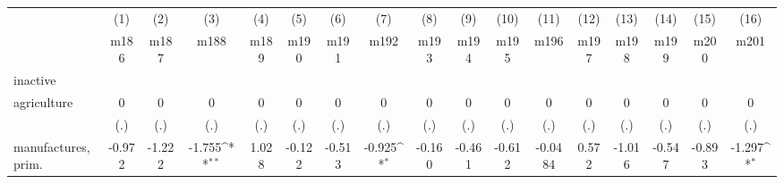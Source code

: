 {
\def\sym#1{\ifmmode^{#1}\else\(^{#1}\)\fi}
\begin{tabular}{l*{16}{c}}
\hline\hline
                    &\multicolumn{1}{c}{(1)}&\multicolumn{1}{c}{(2)}&\multicolumn{1}{c}{(3)}&\multicolumn{1}{c}{(4)}&\multicolumn{1}{c}{(5)}&\multicolumn{1}{c}{(6)}&\multicolumn{1}{c}{(7)}&\multicolumn{1}{c}{(8)}&\multicolumn{1}{c}{(9)}&\multicolumn{1}{c}{(10)}&\multicolumn{1}{c}{(11)}&\multicolumn{1}{c}{(12)}&\multicolumn{1}{c}{(13)}&\multicolumn{1}{c}{(14)}&\multicolumn{1}{c}{(15)}&\multicolumn{1}{c}{(16)}\\
                    &\multicolumn{1}{c}{m186}&\multicolumn{1}{c}{m187}&\multicolumn{1}{c}{m188}&\multicolumn{1}{c}{m189}&\multicolumn{1}{c}{m190}&\multicolumn{1}{c}{m191}&\multicolumn{1}{c}{m192}&\multicolumn{1}{c}{m193}&\multicolumn{1}{c}{m194}&\multicolumn{1}{c}{m195}&\multicolumn{1}{c}{m196}&\multicolumn{1}{c}{m197}&\multicolumn{1}{c}{m198}&\multicolumn{1}{c}{m199}&\multicolumn{1}{c}{m200}&\multicolumn{1}{c}{m201}\\
\hline
inactive            &                     &                     &                     &                     &                     &                     &                     &                     &                     &                     &                     &                     &                     &                     &                     &                     \\
agriculture         &           0         &           0         &           0         &           0         &           0         &           0         &           0         &           0         &           0         &           0         &           0         &           0         &           0         &           0         &           0         &           0         \\
                    &         (.)         &         (.)         &         (.)         &         (.)         &         (.)         &         (.)         &         (.)         &         (.)         &         (.)         &         (.)         &         (.)         &         (.)         &         (.)         &         (.)         &         (.)         &         (.)         \\
[1em]
manufactures, prim. &      -0.972         &      -1.222         &      -1.755\sym{**} &       1.028         &      -0.122         &      -0.513         &      -0.925\sym{*}  &      -0.160         &      -0.461         &      -0.612         &     -0.0484         &       0.572         &      -1.016         &      -0.547         &      -0.893         &      -1.297\sym{*}  \\

\end{tabular}}
